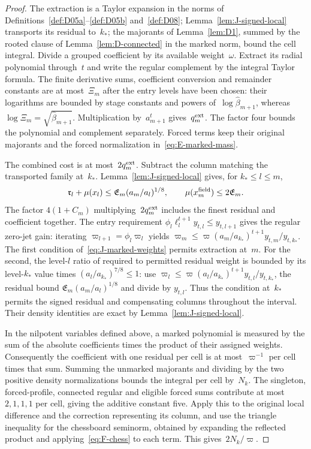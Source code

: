 \begin{proof}\label{proof:J-costs-start}
The extraction is a Taylor expansion in the norms of Definitions~\ref{def:D05a}--\ref{def:D05b} and~\ref{def:D08}; Lemma~\ref{lem:J-signed-local} transports its residual to~$k_*$; the majorants of Lemma~\ref{lem:D1}, summed by the rooted clause of Lemma~\ref{lem:D-connected} in the marked norm, bound the cell integral. Divide a grouped coefficient by its available weight~$\omega$. Extract its radial polynomial through~$t$ and write the regular complement by the integral Taylor formula. The finite derivative sums, coefficient conversion and remainder constants are at most~$\Xi_m$ after the entry levels have been chosen: their logarithms are bounded by stage constants and powers of~$\log\widehat\beta_{m+1}$, whereas $\log \Xi_m=\sqrt{\widehat\beta_{m+1}}$. Multiplication by~$a_{m+1}^t$ gives~$q^{\rm ext}_m$. The factor four bounds the polynomial and complement separately. Forced terms keep their original majorants and the forced normalization in~\eqref{eq:E-marked-mass}.

The combined cost is at most~$2q^{\rm ext}_m$. Subtract the column matching the transported family at~$k_*$. Lemma~\ref{lem:J-signed-local} gives, for $k_*\le l\le m$,
\begin{equation*}
\mathfrak r_l+\mu(x_l)\le
\mathfrak E_m(a_m/a_l)^{1/8},\qquad
\mu(x_m^{\rm field})\le2\mathfrak E_m.
\end{equation*}
The factor $4(1+C_m)$ multiplying~$2q^{\rm ext}_m$ includes the finest residual and coefficient together. The entry requirement $\phi_l\ell_l^{t+1}y_{t,l}\le y_{t,l+1}$ gives the regular zero-jet gain: iterating $\varpi_{l+1}=\phi_l\varpi_l$ yields $\varpi_m\le\varpi(a_m/a_{k_*})^{t+1}y_{t,m}/y_{t,k_*}$.
The first condition of~\eqref{eq:J-marked-weights} permits extraction at~$m$. For the second, the level-$l$ ratio of required to permitted residual weight is bounded by its level-$k_*$ value times $(a_l/a_{k_*})^{7/8}\le1$: use $\varpi_l\le\varpi(a_l/a_{k_*})^{t+1}y_{t,l}/y_{t,k_*}$, the residual bound $\mathfrak E_m(a_m/a_l)^{1/8}$ and divide by $y_{t,l}$. Thus the condition at~$k_*$ permits the signed residual and compensating columns throughout the interval. Their density identities are exact by Lemma~\ref{lem:J-signed-local}.

In the nilpotent variables defined above, a marked polynomial is measured by the sum of the absolute coefficients times the product of their assigned weights. Consequently the coefficient with one residual per cell is at most~$\varpi^{-1}$ per cell times that sum. Summing the unmarked majorants and dividing by the two positive density normalizations bounds the integral per cell by~$N_k$. The singleton, forced-profile, connected regular and eligible forced sums contribute at most $2,1,1,1$ per cell, giving the additive constant five. Apply this to the original local difference and the correction representing its column, and use the triangle inequality for the chessboard seminorm, obtained by expanding the reflected product and applying~\eqref{eq:F-chess} to each term. This gives~$2N_k/\varpi$.


\end{proof}
